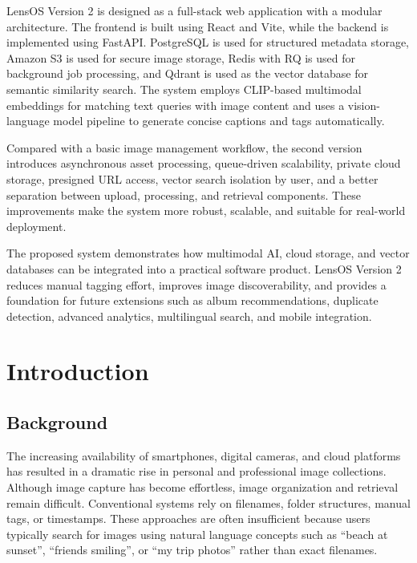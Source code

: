 \documentclass[12pt,a4paper]{report}
\begin{document}
LensOS Version 2 is designed as a full-stack web application with a modular architecture. The frontend is built using React and Vite, while the backend is implemented using FastAPI. PostgreSQL is used for structured metadata storage, Amazon S3 is used for secure image storage, Redis with RQ is used for background job processing, and Qdrant is used as the vector database for semantic similarity search. The system employs CLIP-based multimodal embeddings for matching text queries with image content and uses a vision-language model pipeline to generate concise captions and tags automatically.

Compared with a basic image management workflow, the second version introduces asynchronous asset processing, queue-driven scalability, private cloud storage, presigned URL access, vector search isolation by user, and a better separation between upload, processing, and retrieval components. These improvements make the system more robust, scalable, and suitable for real-world deployment.

The proposed system demonstrates how multimodal AI, cloud storage, and vector databases can be integrated into a practical software product. LensOS Version 2 reduces manual tagging effort, improves image discoverability, and provides a foundation for future extensions such as album recommendations, duplicate detection, advanced analytics, multilingual search, and mobile integration.

\tableofcontents
\listoftables
\listoffigures

\clearpage
{}

\chapter{Introduction}
\section{Background}
The increasing availability of smartphones, digital cameras, and cloud platforms has resulted in a dramatic rise in personal and professional image collections. Although image capture has become effortless, image organization and retrieval remain difficult. Conventional systems rely on filenames, folder structures, manual tags, or timestamps. These approaches are often insufficient because users typically search for images using natural language concepts such as ``beach at sunset'', ``friends smiling'', or ``my trip photos'' rather than exact filenames.
\end{document}
